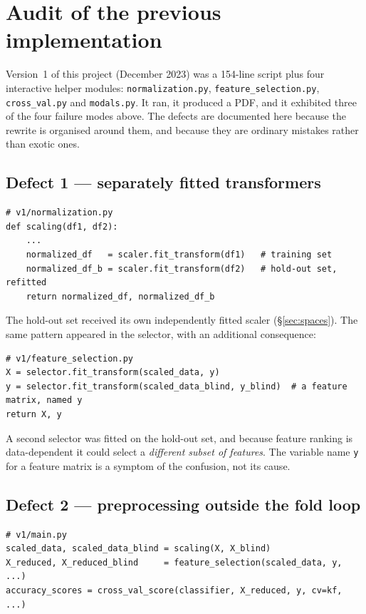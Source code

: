\documentclass[11pt,a4paper]{article}
\begin{document}
\section{Audit of the previous implementation}

Version~1 of this project (December 2023) was a 154-line script plus four
interactive helper modules: \texttt{normalization.py},
\texttt{feature\_selection.py}, \texttt{cross\_val.py} and \texttt{modals.py}.
It ran, it produced a PDF, and it exhibited three of the four failure modes
above. The defects are documented here because the rewrite is organised around
them, and because they are ordinary mistakes rather than exotic ones.

\subsection{Defect 1 --- separately fitted transformers}

\begin{lstlisting}
# v1/normalization.py
def scaling(df1, df2):
    ...
    normalized_df   = scaler.fit_transform(df1)   # training set
    normalized_df_b = scaler.fit_transform(df2)   # hold-out set, refitted
    return normalized_df, normalized_df_b
\end{lstlisting}

The hold-out set received its own independently fitted scaler
(\S\ref{sec:spaces}). The same pattern appeared in the selector, with an
additional consequence:

\begin{lstlisting}
# v1/feature_selection.py
X = selector.fit_transform(scaled_data, y)
y = selector.fit_transform(scaled_data_blind, y_blind)  # a feature matrix, named y
return X, y
\end{lstlisting}

A second selector was fitted on the hold-out set, and because feature ranking
is data-dependent it could select a \emph{different subset of features}. The
variable name \texttt{y} for a feature matrix is a symptom of the confusion,
not its cause.

\subsection{Defect 2 --- preprocessing outside the fold loop}

\begin{lstlisting}
# v1/main.py
scaled_data, scaled_data_blind = scaling(X, X_blind)
X_reduced, X_reduced_blind     = feature_selection(scaled_data, y, ...)
accuracy_scores = cross_val_score(classifier, X_reduced, y, cv=kf, ...)
\end{lstlisting}
\end{document}
